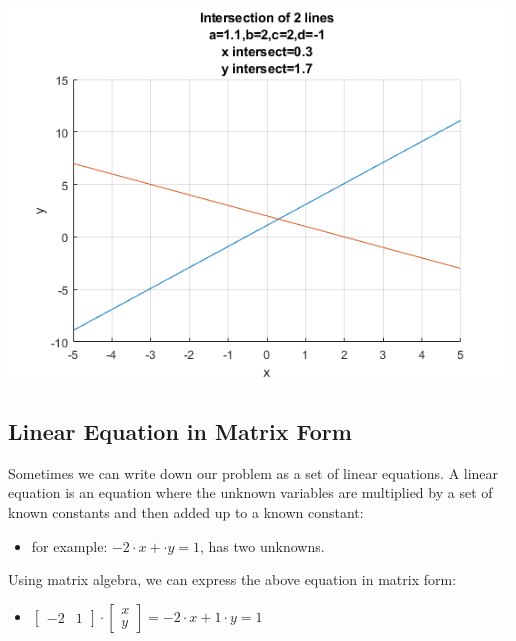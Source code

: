 \documentclass[
]{book}
\providecommand{\tightlist}{%
  \setlength{\itemsep}{0pt}\setlength{\parskip}{0pt}}
\begin{document}
\includegraphics[width=5.20833in,height=\textheight]{img/matrix_linear_system_2_images/figure_0.png}

\hypertarget{linear-equation-in-matrix-form}{%
\subsection{Linear Equation in Matrix Form}\label{linear-equation-in-matrix-form}}

Sometimes we can write down our problem as a set of linear equations. A
linear equation is an equation where the unknown variables are
multiplied by a set of known constants and then added up to a known
constant:

\begin{itemize}
\tightlist
\item
  for example: \(-2\cdot x+\cdot y=1\), has two unknowns.
\end{itemize}

Using matrix algebra, we can express the above equation in matrix form:

\begin{itemize}
\tightlist
\item
  \(\displaystyle \left\lbrack \begin{array}{cc} -2 & 1 \end{array}\right\rbrack \cdot \left\lbrack \begin{array}{c} x\\ y \end{array}\right\rbrack =-2\cdot x+1\cdot y=1\)
\end{itemize}
\end{document}
